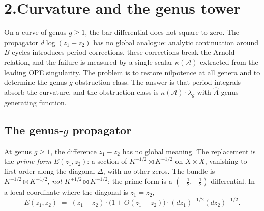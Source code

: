 \providecommand{\cA}{\mathcal{A}}
\providecommand{\barB}{\overline{B}}
\providecommand{\gAmod}{\mathfrak{g}_{\cA}^{\mathrm{mod}}}
\providecommand{\MC}{\text{MC}}
\providecommand{\cM}{\mathcal{M}}
\providecommand{\cC}{\mathcal{C}}
\providecommand{\cO}{\mathcal{O}}
\providecommand{\cP}{\mathcal{P}}
\providecommand{\Eone}{E_1}
\providecommand{\Convinf}{\mathrm{Conv}_\infty}
\providecommand{\Convstr}{\mathrm{Conv}_{\mathrm{str}}}
\providecommand{\orline}[1]{\mathrm{or}(#1)}
\providecommand{\fg}{\mathfrak{g}}

\section*{2.\quad Curvature and the genus tower}

\medskip

\noindent
On a curve of genus $g \geq 1$, the bar differential does not square
to zero. The propagator $d\log(z_1-z_2)$ has no global analogue:
analytic continuation around $B$-cycles introduces period corrections,
these corrections break the Arnold relation, and the failure is
measured by a single scalar $\kappa(\cA)$ extracted from the leading
OPE singularity. The problem is to restore nilpotence at all genera
and to determine the genus-$g$ obstruction class. The answer is that
period integrals absorb the curvature, and the obstruction class is
$\kappa(\cA) \cdot \lambda_g$ with $\hat A$-genus generating function.

\subsection*{The genus-$g$ propagator}

At genus $g\ge 1$, the difference $z_1-z_2$ has no global meaning.
The replacement is the \emph{prime form} $E(z_1,z_2)$: a section
of $K^{-1/2}\boxtimes K^{-1/2}$ on $X\times X$, vanishing to
first order along the diagonal $\Delta$, with no other zeros. The
bundle is $K^{-1/2}\boxtimes K^{-1/2}$, \emph{not}
$K^{+1/2}\boxtimes K^{+1/2}$: the prime form is a
$(-\frac12,-\frac12)$-differential. In a local coordinate where
the diagonal is $z_1=z_2$,
\[
E(z_1,z_2)
\;=\;
(z_1-z_2)\cdot\bigl(1+O(z_1-z_2)\bigr)
\cdot(dz_1)^{-1/2}(dz_2)^{-1/2}.
\]


